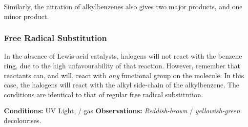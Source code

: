 				Similarly, the nitration of alkylbenzenes also gives two major products, and one minor product.



			\pagebreak
			\subsubsection{Free Radical Substitution}

				In the absence of Lewis-acid catalysts, halogens will not react with the benzene ring, due to the high unfavourability of
				that reaction. However, remember that reactants can, and will, react with \textit{any} functional group on the molecule. In
				this case, the halogens will react with the alkyl side-chain of the alkylbenzene. The conditions are identical to that of
				regular free radical substitution.

				\vspace{1.5em}

				\vbox{\textbf{Conditions:} \tabto{35mm}UV Light,  /  gas}	%
				\vbox{\textbf{Observations:} \tabto{35mm}\textit{\color{Mahogany}Reddish-brown}  / \textit{\color{YellowGreen}yellowish-green}  decolourises.}



